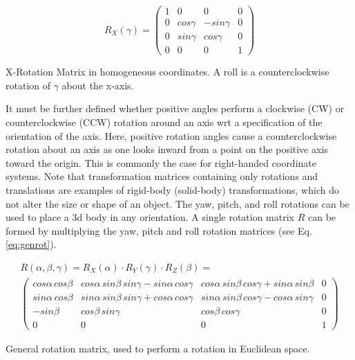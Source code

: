 \begin{Equation}[!htb]
	\centering
	\begin{equation} \label{eq:rotz}
	R_X(\gamma) =
        \begin{pmatrix}
            1 & 0 & 0 & 0 \\
            0 & cos\gamma & -sin\gamma & 0 \\
            0 & sin\gamma & cos\gamma & 0 \\
            0 & 0 & 0 & 1 
        \end{pmatrix}
	\end{equation}
	\caption[X-Rotation Matrix in homogeneous coordinates.]{X-Rotation Matrix in homogeneous coordinates. A roll is a counterclockwise rotation of $\gamma$ about the x-axis.}
\end{Equation} 

\noindent It must be further deﬁned whether positive angles perform a clockwise (CW) or counterclockwise (CCW) rotation around an axis \gls{wrt} a speciﬁcation of the orientation of the axis. Here, positive rotation angles cause a counterclockwise rotation about an axis as one looks inward from a point on the positive axis toward the origin. This is commonly the case for right-handed coordinate systems. Note that transformation matrices containing only rotations and translations are examples of rigid-body (solid-body) transformations, which do not alter the size or shape of an object. The yaw, pitch, and roll rotations can be used to place a \gls{3d} body in any orientation. A single rotation matrix $R$ can be formed by multiplying the yaw, pitch and roll rotation matrices (see Eq. \ref{eq:genrot}).

\begin{Equation}[H]
	\centering
	\begin{equation}
	    \begin{gathered}
    		R(\alpha, \beta, \gamma) = R_X(\alpha) \cdot R_Y(\gamma) \cdot R_Z(\beta)
    		= \\
            \begin{pmatrix}
                cos\alpha \, cos\beta & cos\alpha \, sin\beta \, sin\gamma-sin\alpha \, cos\gamma & cos\alpha \, sin\beta \, cos\gamma +sin\alpha \, sin\beta & 0 \\
                sin\alpha \, cos\beta & sin\alpha \, sin\beta \, sin\gamma +cos\alpha \, cos\gamma & sin\alpha \, sin\beta \, cos\gamma -cos\alpha \, sin\gamma & 0 \\
                -sin\beta & cos\beta \, sin\gamma & cos\beta \, cos\gamma & 0 \\
                0 & 0 & 0 & 1 
            \end{pmatrix}
        \end{gathered}
	\end{equation}
	\caption[General Rotation.]{General rotation matrix, used to perform a rotation in Euclidean space.}
	\label{eq:genrot}
\end{Equation}

